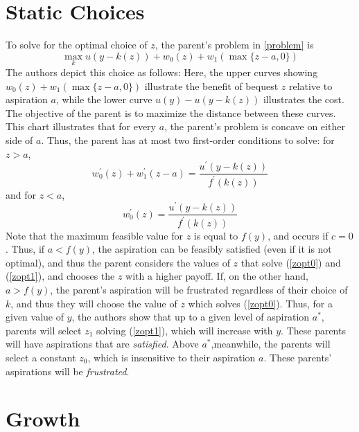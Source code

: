 \documentclass[11pt]{article}
\begin{document}
    \section{Static Choices}
    To solve for the optimal choice of \( z \), the parent's problem in \ref{problem} is 
    \[\max_k u\left( y - k(z) \right) + w_0(z) + w_1(\max\{z - a, 0\})\]
    The authors depict this choice as follows:
    Here, the upper curves showing \( w_0(z) + w_1(\max\{z - a, 0\}) \) illustrate the benefit of bequest \( z \) relative to aspiration \( a \), while the lower curve \( u(y) - u\left( y - k(z) \right) \) illustrates the cost. The objective of the parent is to maximize the distance between these curves. This chart illustrates that for every \( a \), the parent's problem is concave on either side of \( a \). Thus, the parent has at most two first-order conditions to solve: for \( z > a \), 
    \begin{equation}
        w_0^\prime(z) + w_1^\prime(z - a) = \frac{u^\prime(y - k(z))}{f^\prime(k(z))} \label{zopt0}  
    \end{equation}
    and for \( z < a \), 
    \begin{equation}
        w_0^\prime(z) = \frac{u^\prime(y - k(z))}{f^\prime(k(z))} \label{zopt1}
    \end{equation}
    Note that the maximum feasible value for \( z \) is equal to \( f(y) \), and occurs if \( c = 0 \). Thus, if \( a < f(y) \), the aspiration can be feasibly satisfied (even if it is not optimal), and thus the parent considers the values of \( z \) that solve (\ref{zopt0}) and (\ref{zopt1}), and chooses the \( z \) with a higher payoff. If, on the other hand, \( a > f(y) \), the parent's aspiration will be frustrated regardless of their choice of \( k \), and thus they will choose the value of \( z \) which solves (\ref{zopt0}). 
    Thus, for a given value of \( y \), the authors show that up to a given level of aspiration \( a^* \), parents will select \( z_1 \) solving (\ref{zopt1}), which will increase with \( y \). These parents will have aspirations that are \textit{satisfied}. Above \( a^* \),meanwhile, the parents will select a constant \( z_0 \), which is insensitive to their aspiration \( a \). These parents' aspirations will be \textit{frustrated}. 
    \section{Growth}
\end{document}
